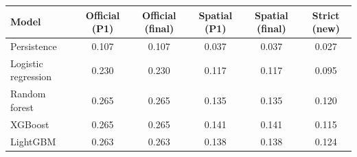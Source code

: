 \begin{tabular}{lccccc}
\toprule
Model & Official (P1) & Official (final) & Spatial (P1) & Spatial (final) & Strict (new) \\
\midrule
Persistence & 0.107 & 0.107 & 0.037 & 0.037 & 0.027 \\
Logistic regression & 0.230 & 0.230 & 0.117 & 0.117 & 0.095 \\
Random forest & 0.265 & 0.265 & 0.135 & 0.135 & 0.120 \\
XGBoost & 0.265 & 0.265 & 0.141 & 0.141 & 0.115 \\
LightGBM & 0.263 & 0.263 & 0.138 & 0.138 & 0.124 \\
\bottomrule
\end{tabular}
